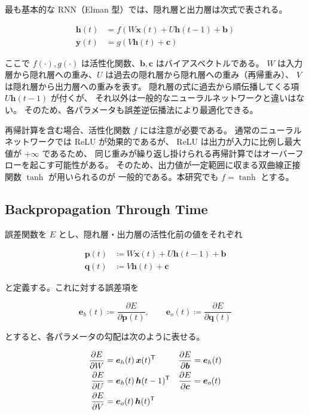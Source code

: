\documentclass[a4paper,11pt,openany]{ltjsreport}
\begin{document}
最も基本的な RNN（Elman 型\cite{elman1990}）では、隠れ層と出力層は次式で表される。

\begin{align}
  \bm{h}(t) &= f\left(W\bm{x}(t) + U\bm{h}(t-1) + \bm{b}\right) \label{eq:rnn_h}\\
  \bm{y}(t) &= g\left(V\bm{h}(t) + \bm{c}\right)                \label{eq:rnn_y}
\end{align}

ここで $f(\cdot), g(\cdot)$ は活性化関数、$\bm{b}, \bm{c}$ はバイアスベクトルである。
$W$ は入力層から隠れ層への重み、$U$ は過去の隠れ層から隠れ層への重み（再帰重み）、
$V$ は隠れ層から出力層への重みを表す。
隠れ層の式に過去から順伝播してくる項 $U\bm{h}(t-1)$ が付くが、
それ以外は一般的なニューラルネットワークと違いはない。
そのため、各パラメータも誤差逆伝播法により最適化できる。

再帰計算を含む場合、活性化関数 $f$ には注意が必要である。
通常のニューラルネットワークでは ReLU が効果的であるが、
ReLU は出力が入力に比例し最大値が $+\infty$ であるため、
同じ重みが繰り返し掛けられる再帰計算ではオーバーフローを起こす可能性がある。
そのため、出力値が一定範囲に収まる双曲線正接関数 $\tanh$ が用いられるのが
一般的である\cite{sugomori2019}。本研究でも $f = \tanh$ とする。

\subsection{Backpropagation Through Time}

誤差関数を $E$ とし、隠れ層・出力層の活性化前の値をそれぞれ

\begin{align}
  \bm{p}(t) &\coloneqq W\bm{x}(t) + U\bm{h}(t-1) + \bm{b} \label{eq:p}\\
  \bm{q}(t) &\coloneqq V\bm{h}(t) + \bm{c}                \label{eq:q}
\end{align}

と定義する。これに対する誤差項を

\begin{equation}
  \bm{e}_h(t) \coloneqq \frac{\partial E}{\partial \bm{p}(t)}, \qquad
  \bm{e}_o(t) \coloneqq \frac{\partial E}{\partial \bm{q}(t)}
  \label{eq:err}
\end{equation}

とすると、各パラメータの勾配は次のように表せる。

\begin{align}
  \frac{\partial E}{\partial W} &= \bm{e}_h(t)\,\bm{x}(t)^{\mathsf{T}} &
  \frac{\partial E}{\partial \bm{b}} &= \bm{e}_h(t) \notag\\
  \frac{\partial E}{\partial U} &= \bm{e}_h(t)\,\bm{h}(t-1)^{\mathsf{T}} &
  \frac{\partial E}{\partial \bm{c}} &= \bm{e}_o(t) \label{eq:grads}\\
  \frac{\partial E}{\partial V} &= \bm{e}_o(t)\,\bm{h}(t)^{\mathsf{T}} & & \notag
\end{align}
\end{document}
